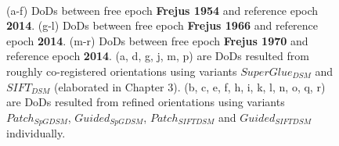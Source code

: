 \begin{figure}[htbp]
\begin{center}
{\begin{minipage}[t]{0.31\linewidth}
			\end{minipage}%
		}
		\\
		
		\caption{{\scriptsize (a-f) \ac{DoD}s between free epoch \textbf{Frejus 1954} and reference epoch \textbf{2014}. (g-l) \ac{DoD}s between free epoch \textbf{Frejus 1966} and reference epoch \textbf{2014}. (m-r) \ac{DoD}s between free epoch \textbf{Frejus 1970} and reference epoch \textbf{2014}. (a, d, g, j, m, p) are \ac{DoD}s resulted from roughly co-registered orientations using variants $SuperGlue_{DSM}$ and $SIFT_{DSM}$ (elaborated in Chapter 3). (b, c, e, f, h, i, k, l, n, o, q, r) are \ac{DoD}s resulted from refined orientations using variants $Patch_{SpGDSM}$, $Guided_{SpGDSM}$, $Patch_{SIFTDSM}$ and $Guided_{SIFTDSM}$ individually.}}
		\label{PreciseDoDFrejus}
	\end{center}
\end{figure} 


